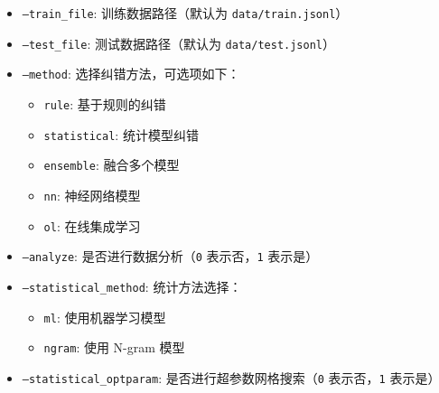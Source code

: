 \documentclass[answers]{exam}  %
\begin{document}
\begin{itemize}
    \item \texttt{--train\_file}: 训练数据路径（默认为 \texttt{data/train.jsonl}）
    \item \texttt{--test\_file}: 测试数据路径（默认为 \texttt{data/test.jsonl}）
    \item \texttt{--method}: 选择纠错方法，可选项如下：
    \begin{itemize}
        \item \texttt{rule}: 基于规则的纠错
        \item \texttt{statistical}: 统计模型纠错
        \item \texttt{ensemble}: 融合多个模型
        \item \texttt{nn}: 神经网络模型
        \item \texttt{ol}: 在线集成学习
    \end{itemize}
    \item \texttt{--analyze}: 是否进行数据分析（\texttt{0} 表示否，\texttt{1} 表示是）
    \item \texttt{--statistical\_method}: 统计方法选择：
    \begin{itemize}
        \item \texttt{ml}: 使用机器学习模型
        \item \texttt{ngram}: 使用 N-gram 模型
    \end{itemize}
    \item \texttt{--statistical\_optparam}: 是否进行超参数网格搜索（\texttt{0} 表示否，\texttt{1} 表示是）
\end{itemize}
\end{document}
